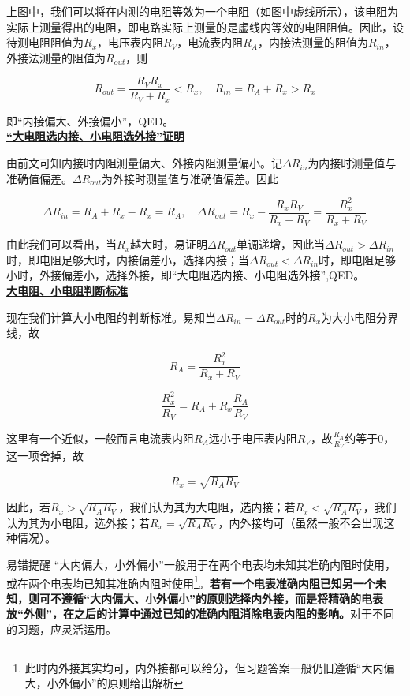 

上图中，我们可以将在内测的电阻等效为一个电阻（如图中虚线所示），该电阻为实际上测量得出的电阻，即电路实际上测量的是虚线内等效的电阻阻值。因此，设待测电阻阻值为$R_x$，电压表内阻$R_V$，电流表内阻$R_A$，内接法测量的阻值为$R_{in}$，外接法测量的阻值为$R_{out}$，则

\begin{equation}
\boxed{R_{out} = \frac{R_V R_x}{R_V + R_x} < R_x ,\quad R_{in} = R_A + R_x > R_x}
\end{equation}

即“内接偏大、外接偏小”，QED。
~\\

\noindent \uline{\textbf{“大电阻选内接、小电阻选外接”证明}}

由前文可知内接时内阻测量偏大、外接内阻测量偏小。记$\Delta R_{in}$为内接时测量值与准确值偏差。$\Delta R_{out}$为外接时测量值与准确值偏差。因此

$$\Delta R_{in} = R_A + R_x - R_x = R_A ,\quad \Delta R_{out} = R_x - \frac{R_x R_V}{R_x + R_V} = \frac{R_x^2}{R_x + R_V}$$

由此我们可以看出，当$R_x$越大时，易证明$\Delta R_{out}$单调递增，因此当$\Delta R_{out} > \Delta R_{in}$时，即电阻足够大时，内接偏差小，选择内接；当$\Delta R_{out} < \Delta R_{in}$时，即电阻足够小时，外接偏差小，选择外接，即“大电阻选内接、小电阻选外接”,QED。
~\\

\noindent \uline{\textbf{大电阻、小电阻判断标准}}

现在我们计算大小电阻的判断标准。易知当$\Delta R_{in} = \Delta R_{out}$时的$R_x$为大小电阻分界线，故

$$R_A = \frac{R_x^2}{R_x + R_V}$$

$$\frac{R_x^2}{R_V} = R_A + R_x \frac{R_A}{R_V}$$

这里有一个近似，一般而言电流表内阻$R_A$远小于电压表内阻$R_V$，故$\frac{R_A}{R_V}$约等于$0$，这一项舍掉，故

\begin{equation}
\boxed{R_x = \sqrt{R_A R_V}}
\end{equation}

因此，若$R_x > \sqrt{R_A R_V}$，我们认为其为大电阻，选内接；若$R_x < \sqrt{R_A R_V}$，我们认为其为小电阻，选外接；若$R_x = \sqrt{R_A R_V}$，内外接均可（虽然一般不会出现这种情况）。

\begin{mk}{易错提醒}{}
“大内偏大，小外偏小”一般用于在两个电表均未知其准确内阻时使用，或在两个电表均已知其准确内阻时使用\footnote{此时内外接其实均可，内外接都可以给分，但习题答案一般仍旧遵循“大内偏大，小外偏小”的原则给出解析}。\textbf{若有一个电表准确内阻已知另一个未知，则可不遵循“大内偏大、小外偏小”的原则选择内外接，而是将精确的电表放“外侧”，在之后的计算中通过已知的准确内阻消除电表内阻的影响。}对于不同的习题，应灵活运用。
\end{mk}

